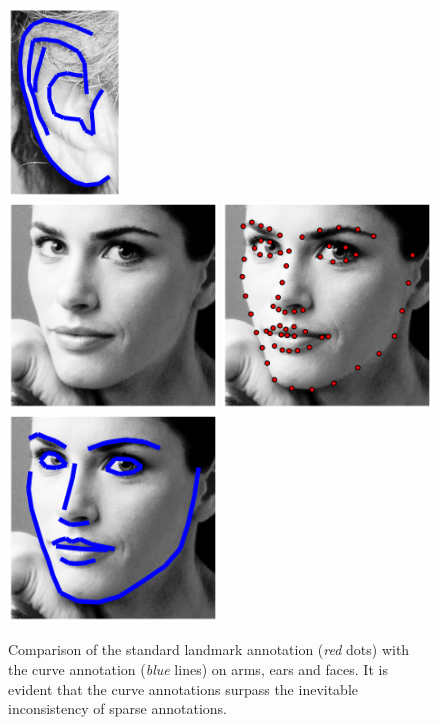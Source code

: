 \begin{figure}
    \hfill
    \includegraphics[height=5.0cm]{resources/Annotation_Correction/Fig_Intro/intro_1_2}
    \\
    \includegraphics[height=5.5cm]{resources/Annotation_Correction/Fig_Intro/intro_0_0}
    \hfill
    \includegraphics[height=5.5cm]{resources/Annotation_Correction/Fig_Intro/intro_0_1}
    \hfill
    \includegraphics[height=5.5cm]{resources/Annotation_Correction/Fig_Intro/intro_0_2}
    \caption{Comparison of the standard landmark annotation (\emph{red} dots) with the curve annotation (\emph{blue} lines) on arms, ears and faces. It is evident that the curve annotations surpass the inevitable inconsistency of sparse annotations.}
    \label{fig:intro_annotation_correction}
\end{figure}

